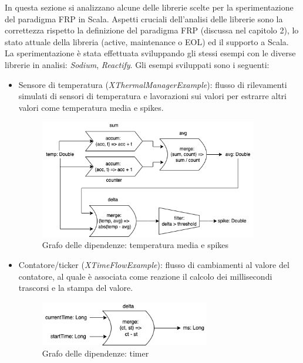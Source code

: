 \documentclass[../main.tex]{subfiles}
\begin{document}
In questa sezione si analizzano alcune delle librerie scelte per la sperimentazione del paradigma FRP in Scala. Aspetti cruciali dell'analisi delle librerie sono la correttezza rispetto la definizione del paradigma FRP (discussa nel capitolo 2), lo stato attuale della libreria (active, maintenance o EOL) ed il supporto a Scala. La sperimentazione è stata effettuata sviluppando gli stessi esempi con le diverse librerie in analisi: \textit{Sodium}, \textit{Reactify}. Gli esempi sviluppati sono i seguenti:
\begin{itemize}
    \item Sensore di temperatura (\textit{XThermalManagerExample}): flusso di rilevamenti simulati di sensori di temperatura e lavorazioni sui valori per estrarre altri valori come temperatura media e spikes.
    \begin{figure}[H]
        \centering
        \includegraphics[width=0.9\textwidth]{img/frp-scala-Page-3.drawio.png}
        \caption{Grafo delle dipendenze: temperatura media e spikes}
    \end{figure}
    \item Contatore/ticker (\textit{XTimeFlowExample}): flusso di cambiamenti al valore del contatore, al quale è associata come reazione il calcolo dei millisecondi trascorsi e la stampa del valore.
    \begin{figure}[H]
        \centering
        \includegraphics[width=0.7\textwidth]{img/frp-scala-Page-4.drawio.png}
        \caption{Grafo delle dipendenze: timer}
    \end{figure}
\end{itemize}
\end{document}
